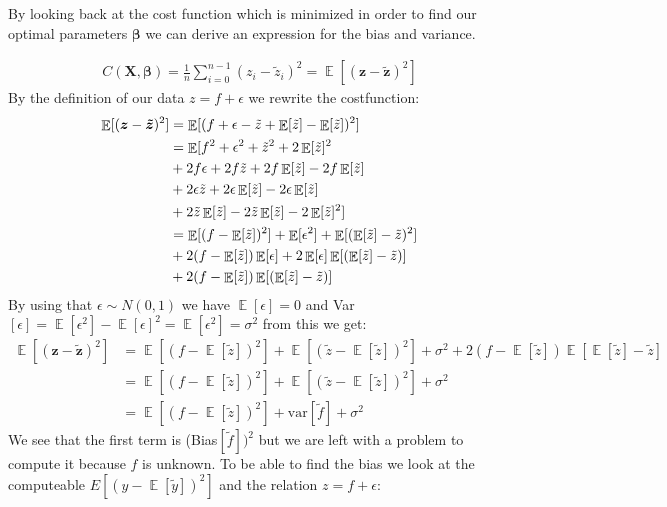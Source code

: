 \documentclass[12pt]{article}
\DeclareMathOperator*{\E}{\mathbb{E}}
\begin{document}
By looking back at the cost function which is minimized in order to find our optimal parameters $\boldsymbol{\beta}$ we can derive an expression for the bias and variance.

\begin{align*}
  C(\boldsymbol{X}, \boldsymbol{\beta}) = \frac{1 }{n }\sum_ {i=0}^{n-1}(z_i - \tilde{z}_i)^2 = \E[(\boldsymbol{z}- \boldsymbol{\tilde{z}})^2]
\end{align*}
By the definition of our data $z = f +\epsilon$ we rewrite the costfunction:
\begin{align*}
  \E[(\boldsymbol{z}- \boldsymbol{\tilde{z}})^2] &= \E[(f + \epsilon - \tilde{z} + \E[\tilde{z}]- \E[\tilde{z}])^2] \\                                             &= \E[f^2 + \epsilon^2 + \tilde{z}^2 + 2\E[\tilde{z}]^2 \\
                                                 &+ 2f\epsilon + 2f\tilde{z} + 2f\E[\tilde{z}] - 2f\E[\tilde{z}]\\
                                                 &+ 2\epsilon\tilde{z} + 2\epsilon \E[\tilde{z}] - 2\epsilon \E[\tilde{z}]\\
                                                 &+ 2\tilde{z}\E[\tilde{z}] - 2\tilde{z}\E[\tilde{z}] -2\E[\tilde{z}]^2]\\
                                                 &= \E[(f-\E[\Tilde{z}])^2] + \E[\epsilon^2] + \E[( \E[\Tilde{z}] - \Tilde{z} )^2] \\
                                                 &+ 2(f-\E[\tilde{z}])\E[\epsilon]+2\E[\epsilon]\E[(\E[\tilde{z}]-\tilde{z} )] \\
                                                &+ 2(f-\E[\tilde{z}])\E[( \E[\tilde{z}] - \tilde{z} )]
\end{align*}
By using that $\epsilon \sim N(0,1)$ we have $\E[\epsilon] = 0$ and Var$[\epsilon] = \E[\epsilon^2]- \E[\epsilon]^2 = \E[\epsilon^2]=\sigma^2$ from this we get:
\begin{align*}
  \E[(\boldsymbol{z}- \boldsymbol{\tilde{z}})^2] &=\E[(f -\E[\tilde{z}])^2] +\E[( \tilde{z} -\E[\tilde{z}])^2]  + \sigma^2+ 2(f-\E[\tilde{z}])\E[\E[\tilde{z}] -\tilde{z}]\\
  &=\E[(f -\E[\tilde{z}])^2]  + \E[( \tilde{z} -\E[\tilde{z}])^2]+\sigma^2\\
  &= \E[(f -\E[\tilde{z}])^2]  + \text{var}[\tilde{f}] + \sigma^2
\end{align*}
We see that the first term is (Bias$[\tilde{f}])^2$ but we are left with a problem to compute it because $f$ is unknown. To be able to find the bias we look at the computeable $E[(y - \E[\tilde{y}])^2]$ and the relation $z= f + \epsilon$:
\end{document}
